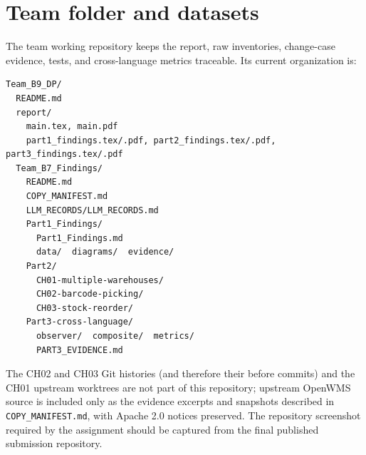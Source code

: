 \documentclass[11pt,a4paper]{article}
\newcommand{\code}[1]{\nolinkurl{#1}}
\begin{document}
\section{Team folder and datasets}
The team working repository keeps the report, raw inventories, change-case evidence, tests, and cross-language metrics traceable. Its current organization is:
\begin{verbatim}
Team_B9_DP/
  README.md
  report/
    main.tex, main.pdf
    part1_findings.tex/.pdf, part2_findings.tex/.pdf, part3_findings.tex/.pdf
  Team_B7_Findings/
    README.md
    COPY_MANIFEST.md
    LLM_RECORDS/LLM_RECORDS.md
    Part1_Findings/
      Part1_Findings.md
      data/  diagrams/  evidence/
    Part2/
      CH01-multiple-warehouses/
      CH02-barcode-picking/
      CH03-stock-reorder/
    Part3-cross-language/
      observer/  composite/  metrics/
      PART3_EVIDENCE.md
\end{verbatim}
The CH02 and CH03 Git histories (and therefore their before commits) and the CH01 upstream worktrees are not part of this repository; upstream OpenWMS source is included only as the evidence excerpts and snapshots described in \code{COPY_MANIFEST.md}, with Apache 2.0 notices preserved. The repository screenshot required by the assignment should be captured from the final published submission repository.
\end{document}
